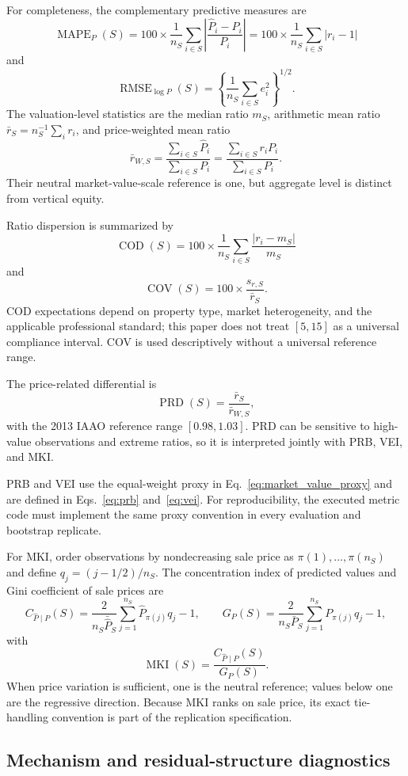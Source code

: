 \documentclass[10pt]{article}
\theoremstyle{definition}
\newcommand{\1}{\mathbf{1}}
\begin{document}
For completeness, the complementary predictive measures are
\[
\operatorname{MAPE}_P(S)=100\times\frac{1}{n_S}\sum_{i\in S}\left|\frac{\widehat P_i-P_i}{P_i}\right|
=100\times\frac{1}{n_S}\sum_{i\in S}|r_i-1|
\]
and
\[
\operatorname{RMSE}_{\log P}(S)=\left\{\frac{1}{n_S}\sum_{i\in S}e_i^2\right\}^{1/2}.
\]
The valuation-level statistics are the median ratio $m_S$, arithmetic mean ratio $\bar r_S=n_S^{-1}\sum_i r_i$, and price-weighted mean ratio
\[
\bar r_{W,S}=\frac{\sum_{i\in S}\widehat P_i}{\sum_{i\in S}P_i}
=\frac{\sum_{i\in S}r_iP_i}{\sum_{i\in S}P_i}.
\]
Their neutral market-value-scale reference is one, but aggregate level is distinct from vertical equity.

Ratio dispersion is summarized by
\[
\operatorname{COD}(S)=100\times\frac{1}{n_S}\sum_{i\in S}\frac{|r_i-m_S|}{m_S}
\]
and
\[
\operatorname{COV}(S)=100\times\frac{s_{r,S}}{\bar r_S}.
\]
COD expectations depend on property type, market heterogeneity, and the applicable professional standard; this paper does not treat $[5,15]$ as a universal compliance interval. COV is used descriptively without a universal reference range.

The price-related differential is
\[
\operatorname{PRD}(S)=\frac{\bar r_S}{\bar r_{W,S}},
\]
with the 2013 IAAO reference range $[0.98,1.03]$. PRD can be sensitive to high-value observations and extreme ratios, so it is interpreted jointly with PRB, VEI, and MKI.

PRB and VEI use the equal-weight proxy in Eq.~\eqref{eq:market_value_proxy} and are defined in Eqs.~\eqref{eq:prb} and~\eqref{eq:vei}. For reproducibility, the executed metric code must implement the same proxy convention in every evaluation and bootstrap replicate.

For MKI, order observations by nondecreasing sale price as $\pi(1),\ldots,\pi(n_S)$ and define $q_j=(j-1/2)/n_S$. The concentration index of predicted values and Gini coefficient of sale prices are
\[
C_{\widehat P\mid P}(S)=\frac{2}{n_S\bar{\widehat P}_S}\sum_{j=1}^{n_S}\widehat P_{\pi(j)}q_j-1,
\qquad
G_P(S)=\frac{2}{n_S\bar P_S}\sum_{j=1}^{n_S}P_{\pi(j)}q_j-1,
\]
with
\[
\operatorname{MKI}(S)=\frac{C_{\widehat P\mid P}(S)}{G_P(S)}.
\]
When price variation is sufficient, one is the neutral reference; values below one are the regressive direction. Because MKI ranks on sale price, its exact tie-handling convention is part of the replication specification.

\subsection{Mechanism and residual-structure diagnostics}
\end{document}
